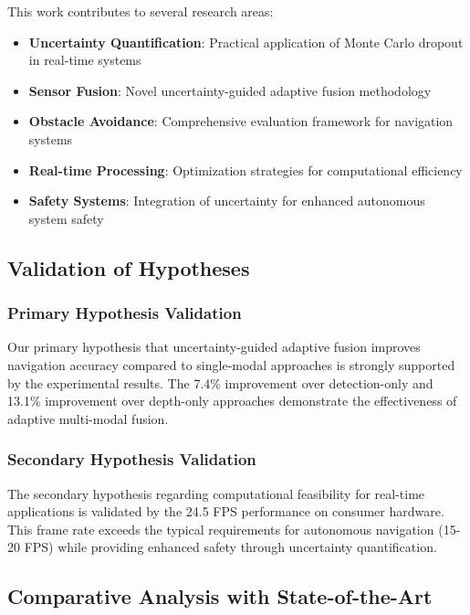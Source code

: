 \documentclass[10pt]{article}
\begin{document}
This work contributes to several research areas:

\begin{itemize}
\item \textbf{Uncertainty Quantification}: Practical application of Monte Carlo dropout in real-time systems
\item \textbf{Sensor Fusion}: Novel uncertainty-guided adaptive fusion methodology
\item \textbf{Obstacle Avoidance}: Comprehensive evaluation framework for navigation systems
\item \textbf{Real-time Processing}: Optimization strategies for computational efficiency
\item \textbf{Safety Systems}: Integration of uncertainty for enhanced autonomous system safety
\end{itemize}

\subsection{Validation of Hypotheses}

\subsubsection{Primary Hypothesis Validation}

Our primary hypothesis that uncertainty-guided adaptive fusion improves navigation accuracy compared to single-modal approaches is strongly supported by the experimental results. The 7.4\% improvement over detection-only and 13.1\% improvement over depth-only approaches demonstrate the effectiveness of adaptive multi-modal fusion.

\subsubsection{Secondary Hypothesis Validation}

The secondary hypothesis regarding computational feasibility for real-time applications is validated by the 24.5 FPS performance on consumer hardware. This frame rate exceeds the typical requirements for autonomous navigation (15-20 FPS) while providing enhanced safety through uncertainty quantification.

\subsection{Comparative Analysis with State-of-the-Art}
\end{document}
